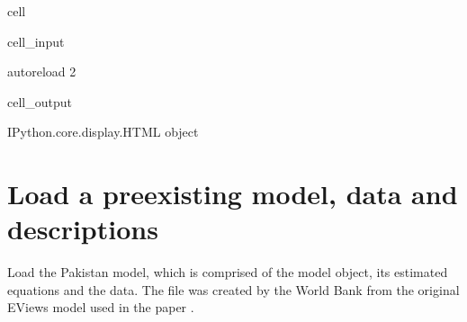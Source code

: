 \documentclass[letterpaper,10pt,english]{jupyterBook}
\begin{document}
\begin{sphinxuseclass}{cell}\begin{sphinxVerbatimInput}

\begin{sphinxuseclass}{cell_input}
\begin{sphinxVerbatim}[commandchars=\\\{\}]
    
 autoreload
 2
\end{sphinxVerbatim}

\end{sphinxuseclass}\end{sphinxVerbatimInput}
\begin{sphinxVerbatimOutput}

\begin{sphinxuseclass}{cell_output}
\begin{sphinxVerbatim}[commandchars=\\\{\}]
\PYGZlt{}IPython.core.display.HTML object\PYGZgt{}
\end{sphinxVerbatim}

\end{sphinxuseclass}\end{sphinxVerbatimOutput}

\end{sphinxuseclass}

\section{Load a pre\sphinxhyphen{}existing model, data and descriptions}
\label{\detokenize{content/05_WBModels/MoreComplexScenarios:load-a-pre-existing-model-data-and-descriptions}}
\sphinxAtStartPar
Load the Pakistan model, which is comprised of the model object, its estimated equations and the data.  The  file was created by the World Bank from the original EViews model used in the paper .
\end{document}

